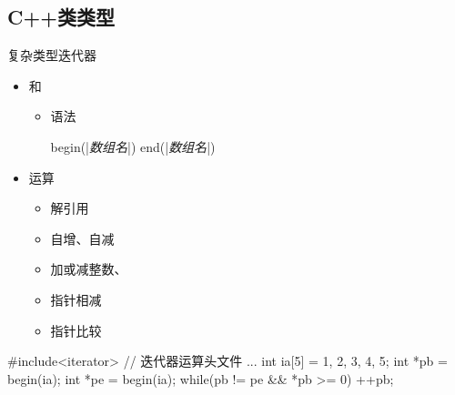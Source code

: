\subsection[C++类类型]{C++类类型}
\begin{frame}[fragile]{复杂类型}{迭代器}
  \begin{itemize}
  \item {}和
    \begin{itemize}
    \item 语法\\
      \begin{center}
        \begin{minipage}{0.6\linewidth}
          \begin{cpptt}
begin(|\emph{数组名}|)
end(|\emph{数组名}|)
          \end{cpptt}
          \end{minipage}
      \end{center}
    \end{itemize}
  \item 运算
    \begin{itemize}
    \item 解引用
    \item 自增、自减
    \item 加或减整数、
    \item 指针相减
    \item 指针比较
    \end{itemize}
  \end{itemize}
  \begin{center}
    \begin{minipage}{0.6\linewidth}
      \begin{cppcode}
#include<iterator>  // 迭代器运算头文件
...
int ia[5] = {1, 2, 3, 4, 5};
int *pb = begin(ia);
int *pe = begin(ia);
while(pb != pe && *pb >= 0)
{
  ++pb;
}
      \end{cppcode}
    \end{minipage}
  \end{center}
\end{frame}
